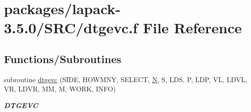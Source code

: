 \hypertarget{dtgevc_8f}{}\section{packages/lapack-\/3.5.0/\+S\+R\+C/dtgevc.f File Reference}
\label{dtgevc_8f}
\subsection*{Functions/\+Subroutines}
\begin{DoxyCompactItemize}
\item 
subroutine \hyperlink{group__doubleGEcomputational_ga60fe6f45ae036702cf7affea4f0de69c}{dtgevc} (S\+I\+D\+E, H\+O\+W\+M\+N\+Y, S\+E\+L\+E\+C\+T, \hyperlink{polmisc_8c_a0240ac851181b84ac374872dc5434ee4}{N}, S, L\+D\+S, P, L\+D\+P, V\+L, L\+D\+V\+L, V\+R, L\+D\+V\+R, M\+M, M, W\+O\+R\+K, I\+N\+F\+O)
\begin{DoxyCompactList}\small\item\em {\bfseries D\+T\+G\+E\+V\+C} \end{DoxyCompactList}\end{DoxyCompactItemize}
